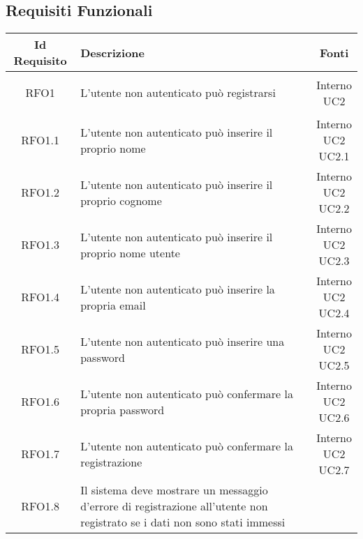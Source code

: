 \subsection{Requisiti Funzionali}
\normalsize
\begin{longtable}{|c|>{\centering}m{7cm}|c|}
\hline
\textbf{Id Requisito} & \textbf{Descrizione} & \textbf{Fonti}\\
\hline
\endhead \hypertarget{{RFO1}}{{RFO1}} & L’utente non autenticato può registrarsi & \makecell{Interno\\ UC2 } \\ \hline
			 \hypertarget{{RFO1.1}}{{RFO1.1}} & L’utente non autenticato può inserire il
proprio nome & \makecell{Interno\\ UC2 \\UC2.1 } \\ \hline
			 \hypertarget{{RFO1.2}}{{RFO1.2}} & L’utente non autenticato può inserire il
proprio cognome & \makecell{Interno\\ UC2 \\UC2.2 } \\ \hline
			 \hypertarget{{RFO1.3}}{{RFO1.3}} & L’utente non autenticato può inserire il
proprio nome utente & \makecell{Interno\\ UC2 \\UC2.3 } \\ \hline
			 \hypertarget{{RFO1.4}}{{RFO1.4}} & L’utente non autenticato può inserire la
propria email & \makecell{Interno\\ UC2 \\UC2.4 } \\ \hline
			 \hypertarget{{RFO1.5}}{{RFO1.5}} & L’utente non autenticato può inserire una
password & \makecell{Interno\\ UC2 \\UC2.5 } \\ \hline
			 \hypertarget{{RFO1.6}}{{RFO1.6}} & L’utente non autenticato può confermare
la propria password & \makecell{Interno\\ UC2 \\UC2.6 } \\ \hline
			 \hypertarget{{RFO1.7}}{{RFO1.7}} & L’utente non autenticato può confermare
la registrazione & \makecell{Interno\\ UC2 \\UC2.7 } \\ \hline
			 \hypertarget{{RFO1.8}}{{RFO1.8}} & Il sistema deve mostrare un messaggio
d’errore di registrazione all’utente non
registrato se i dati non sono stati immessi

\end{longtable}
